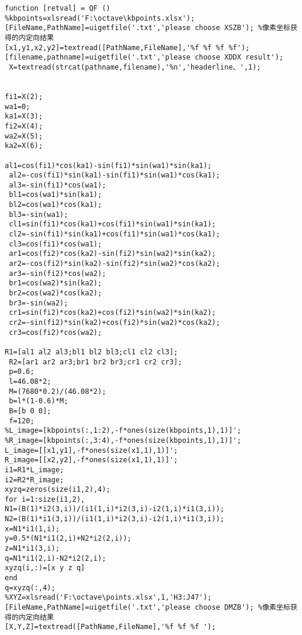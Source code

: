 \begin{lstlisting}[caption=QF\_JDDX.m]
function [retval] = QF ()
%kbpoints=xlsread('F:\octave\kbpoints.xlsx');
[FileName,PathName]=uigetfile('.txt','please choose XSZB'); %像素坐标获得的内定向结果
[x1,y1,x2,y2]=textread([PathName,FileName],'%f %f %f %f');
[filename,pathname]=uigetfile('.txt','please choose XDDX result');
 X=textread(strcat(pathname,filename),'%n','headerline、',1);


fi1=X(2);
wa1=0;
ka1=X(3);
fi2=X(4);
wa2=X(5);
ka2=X(6);

al1=cos(fi1)*cos(ka1)-sin(fi1)*sin(wa1)*sin(ka1);
 al2=-cos(fi1)*sin(ka1)-sin(fi1)*sin(wa1)*cos(ka1);
 al3=-sin(fi1)*cos(wa1);
 bl1=cos(wa1)*sin(ka1);
 bl2=cos(wa1)*cos(ka1);
 bl3=-sin(wa1);
 cl1=sin(fi1)*cos(ka1)+cos(fi1)*sin(wa1)*sin(ka1);
 cl2=-sin(fi1)*sin(ka1)+cos(fi1)*sin(wa1)*cos(ka1);
 cl3=cos(fi1)*cos(wa1);
 ar1=cos(fi2)*cos(ka2)-sin(fi2)*sin(wa2)*sin(ka2);
 ar2=-cos(fi2)*sin(ka2)-sin(fi2)*sin(wa2)*cos(ka2);
 ar3=-sin(fi2)*cos(wa2);
 br1=cos(wa2)*sin(ka2);
 br2=cos(wa2)*cos(ka2);
 br3=-sin(wa2);
 cr1=sin(fi2)*cos(ka2)+cos(fi2)*sin(wa2)*sin(ka2);
 cr2=-sin(fi2)*sin(ka2)+cos(fi2)*sin(wa2)*cos(ka2);
 cr3=cos(fi2)*cos(wa2);
 
R1=[al1 al2 al3;bl1 bl2 bl3;cl1 cl2 cl3];
 R2=[ar1 ar2 ar3;br1 br2 br3;cr1 cr2 cr3];
 p=0.6;
 l=46.08*2;
 M=(7680*0.2)/(46.08*2);
 b=l*(1-0.6)*M;
 B=[b 0 0];
 f=120;
%L_image=[kbpoints(:,1:2),-f*ones(size(kbpoints,1),1)]';
%R_image=[kbpoints(:,3:4),-f*ones(size(kbpoints,1),1)]';
L_image=[[x1,y1],-f*ones(size(x1,1),1)]';
R_image=[[x2,y2],-f*ones(size(x1,1),1)]';
i1=R1*L_image;
i2=R2*R_image;
xyzq=zeros(size(i1,2),4);
for i=1:size(i1,2),
N1=(B(1)*i2(3,i))/(i1(1,i)*i2(3,i)-i2(1,i)*i1(3,i));
N2=(B(1)*i1(3,i))/(i1(1,i)*i2(3,i)-i2(1,i)*i1(3,i));
x=N1*i1(1,i);
y=0.5*(N1*i1(2,i)+N2*i2(2,i));
z=N1*i1(3,i);
q=N1*i1(2,i)-N2*i2(2,i);
xyzq(i,:)=[x y z q]
end
q=xyzq(:,4);
%XYZ=xlsread('F:\octave\points.xlsx',1,'H3:J47');
[FileName,PathName]=uigetfile('.txt','please choose DMZB'); %像素坐标获得的内定向结果
[X,Y,Z]=textread([PathName,FileName],'%f %f %f ');


\end{lstlisting}
